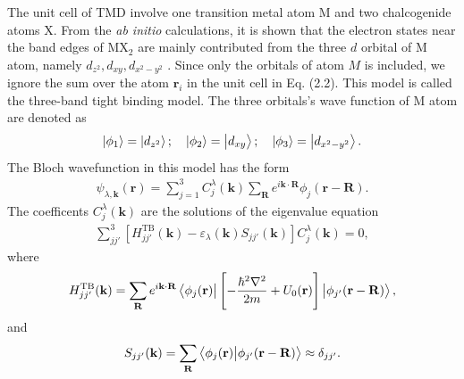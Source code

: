 \documentclass{report}
\newcommand{\f}[2]{\dfrac{#1}{#2}}
\begin{document}
The unit cell of \ac{TMD} involve one transition metal atom M and two chalcogenide atoms X. From the \textit{ab initio} calculations, it is shown that the electron states near the band edges of MX$_{2}$ are mainly contributed from the three $d$ orbital of M atom, namely $d_{z^{2}},d_{xy},d_{x^{2}-y^{2}}$ \cite{PhysRevB.88.085433}. Since only the orbitals of atom $M$ is included, we ignore the sum over the atom $\mathbf{r}_{i}$ in the unit cell in Eq. (2.2). This model is called the three-band tight binding model. The three orbitals's wave function of M atom are denoted as
\begin{gather}
	\ket{\phi_{1}} = \ket{d_{z^{2}}} ; \quad \ket{\phi_{2}} = \ket{d_{xy}} ; \quad \ket{\phi_{3}} = \ket{d_{x^{2} - y^{2}}}.
\end{gather}
The Bloch wavefunction in this model has the form
\begin{gather}
	\psi_{\lambda,\mathbf{k}}(\mathbf{r}) = \sum_{j=1}^{3} C_{j}^{\lambda}(\mathbf{k}) \sum_{\mathbf{R}} e^{i \mathbf{k \cdot R}} \phi_{j}(\mathbf{r} - \mathbf{R}).
\end{gather}
The coefficents $C_{j}^{\lambda}(\mathbf{k})$ are the solutions of the eigenvalue equation
\begin{gather}
	\sum_{jj'}^{3} \left[H_{jj'}^{\text{TB}}(\mathbf{k}) - \varepsilon_{\lambda}(\mathbf{k}) S_{jj'}(\mathbf{k})\right] C_{j}^{\lambda}(\mathbf{k}) = 0,
\end{gather}
where
\begin{equation}
	\begin{aligned}
		H_{jj'}^{\text{TB}}(\mathbf{k}) = \sum_{\mathbf{R}} e^{i \mathbf{k \cdot R}} \bra{\phi_{j}(\mathbf{r})} \left[-\f{\hbar^{2} \nabla^{2}}{2m} + U_{0}(\mathbf{r})\right] \ket{\phi_{j'}(\mathbf{r - R})},
	\end{aligned}
\end{equation}
and
\begin{equation}
	\begin{aligned}
		S_{jj'}(\mathbf{k}) = \sum_{\mathbf{R}} \bra{\phi_{j}(\mathbf{r})} \ket{\phi_{j'}(\mathbf{r - R})} \approx \delta_{jj'}.
	\end{aligned}
\end{equation}
\end{document}
